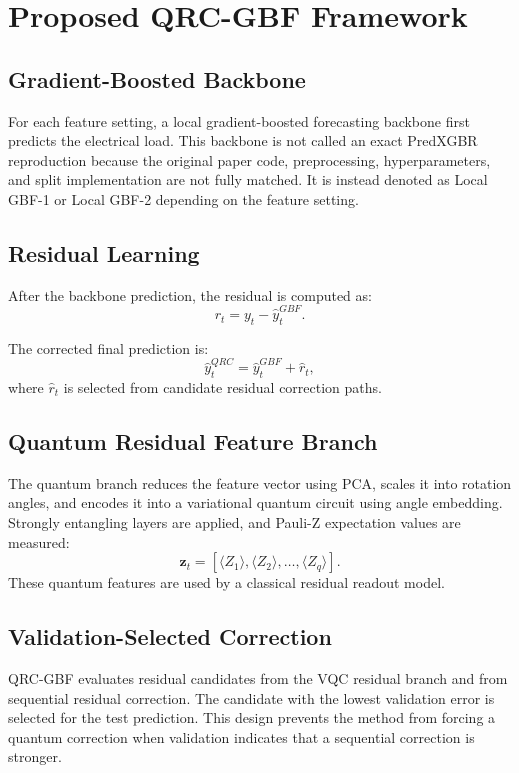 \documentclass[11pt]{article}
\begin{document}
\section{Proposed QRC-GBF Framework}
\subsection{Gradient-Boosted Backbone}
For each feature setting, a local gradient-boosted forecasting backbone first predicts the electrical load. This backbone is not called an exact PredXGBR reproduction because the original paper code, preprocessing, hyperparameters, and split implementation are not fully matched. It is instead denoted as Local GBF-1 or Local GBF-2 depending on the feature setting.

\subsection{Residual Learning}
After the backbone prediction, the residual is computed as:
\begin{equation}
r_t = y_t - \hat{y}^{GBF}_t.
\end{equation}

The corrected final prediction is:
\begin{equation}
\hat{y}^{QRC}_t = \hat{y}^{GBF}_t + \hat{r}_t,
\end{equation}
where $\hat{r}_t$ is selected from candidate residual correction paths.

\subsection{Quantum Residual Feature Branch}
The quantum branch reduces the feature vector using PCA, scales it into rotation angles, and encodes it into a variational quantum circuit using angle embedding. Strongly entangling layers are applied, and Pauli-Z expectation values are measured:
\begin{equation}
\mathbf{z}_t = [\langle Z_1\rangle, \langle Z_2\rangle, \ldots, \langle Z_q\rangle].
\end{equation}
These quantum features are used by a classical residual readout model.

\subsection{Validation-Selected Correction}
QRC-GBF evaluates residual candidates from the VQC residual branch and from sequential residual correction. The candidate with the lowest validation error is selected for the test prediction. This design prevents the method from forcing a quantum correction when validation indicates that a sequential correction is stronger.
\end{document}
